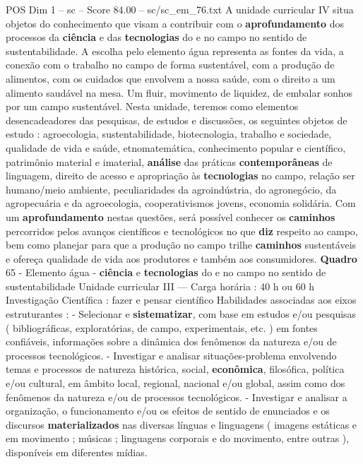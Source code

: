 \begin{textsample}{POS Dim 1 – sc – Score 84.00 – sc/sc\_em\_76.txt}
A unidade curricular IV situa objetos do conhecimento que visam a contribuir com o \textbf{aprofundamento} dos processos da \textbf{ciência} e das \textbf{tecnologias} do e no campo no sentido de sustentabilidade.
A escolha pelo elemento água representa as fontes da vida, a conexão com o trabalho no campo de forma sustentável, com a produção de alimentos, com os cuidados que envolvem a nossa saúde, com o direito a um alimento saudável na mesa.
Um fluir, movimento de liquidez, de embalar sonhos por um campo sustentável.
Nesta unidade, teremos como elementos desencadeadores das pesquisas, de estudos e discussões, os seguintes objetos de estudo : agroecologia, sustentabilidade, biotecnologia, trabalho e sociedade, qualidade de vida e saúde, etnomatemática, conhecimento popular e científico, patrimônio material e imaterial, \textbf{análise} das práticas \textbf{contemporâneas} de linguagem, direito de acesso e apropriação às \textbf{tecnologias} no campo, relação ser humano/meio ambiente, peculiaridades da agroindústria, do agronegócio, da agropecuária e da agroecologia, cooperativismos jovens, economia solidária.
Com um \textbf{aprofundamento} nestas questões, será possível conhecer os \textbf{caminhos} percorridos pelos avanços científicos e tecnológicos no que \textbf{diz} respeito ao campo, bem como planejar para que a produção no campo trilhe \textbf{caminhos} sustentáveis e ofereça qualidade de vida aos produtores e também aos consumidores. \textbf{Quadro} 65 - Elemento água - \textbf{ciência} e \textbf{tecnologias} do e no campo no sentido de sustentabilidade Unidade curricular III — Carga horária : 40 h ou 60 h Investigação Científica : fazer e pensar científico Habilidades associadas aos eixos estruturantes : - Selecionar e \textbf{sistematizar}, com base em estudos e/ou pesquisas ( bibliográficas, exploratórias, de campo, experimentais, etc. ) em fontes confiáveis, informações sobre a dinâmica dos fenômenos da natureza e/ou de processos tecnológicos. - Investigar e analisar situações-problema envolvendo temas e processos de natureza histórica, social, \textbf{econômica}, filosófica, política e/ou cultural, em âmbito local, regional, nacional e/ou global, assim como dos fenômenos da natureza e/ou de processos tecnológicos. - Investigar e analisar a organização, o funcionamento e/ou os efeitos de sentido de enunciados e os discursos \textbf{materializados} nas diversas línguas e linguagens ( imagens estáticas e em movimento ; músicas ; linguagens corporais e do movimento, entre outras ), disponíveis em diferentes mídias.

\end{textsample}
